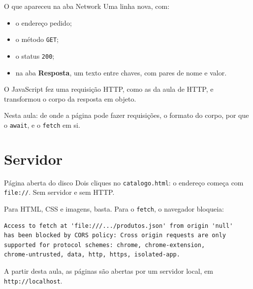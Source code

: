 \documentclass{beamer}
\begin{document}
\begin{frame}{O que apareceu na aba Network}
	Uma linha nova, com:
	\begin{itemize}
		\item o endereço pedido;
		\item o método \texttt{GET};
		\item o status \texttt{200};
		\item na aba \textbf{Resposta}, um texto entre chaves, com pares de nome e
		      valor.
	\end{itemize}

	\vspace{0.3cm}
	O JavaScript fez uma requisição HTTP, como as da aula de HTTP, e transformou
	o corpo da resposta em objeto.

	\vspace{0.3cm}
	Nesta aula: de onde a página pode fazer requisições, o formato do corpo, por
	que o \texttt{await}, e o \texttt{fetch} em si.
\end{frame}

\section{Servidor}

\begin{frame}[fragile]{Página aberta do disco}
	Dois cliques no \texttt{catalogo.html}: o endereço começa com
	\texttt{file://}. Sem servidor e sem HTTP.

	\vspace{0.3cm}
	Para HTML, CSS e imagens, basta. Para o \texttt{fetch}, o navegador bloqueia:

	\begin{verbatim}
Access to fetch at 'file:///.../produtos.json' from origin 'null'
has been blocked by CORS policy: Cross origin requests are only
supported for protocol schemes: chrome, chrome-extension,
chrome-untrusted, data, http, https, isolated-app.
	\end{verbatim}

	\vspace{0.2cm}
	A partir desta aula, as páginas são abertas por um servidor local, em
	\texttt{http://localhost}.
\end{frame}
\end{document}
